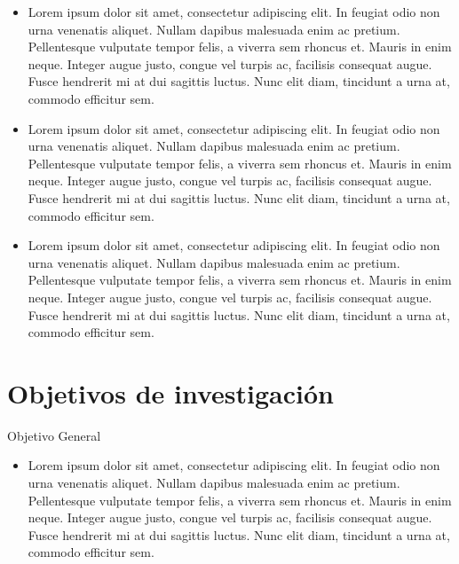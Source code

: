 \documentclass[letterpaper,twoside,10pt]{report}
\begin{document}
\begin{itemize}
 \item Lorem ipsum dolor sit amet, consectetur adipiscing elit. In feugiat odio non urna venenatis aliquet. Nullam dapibus malesuada enim ac pretium. Pellentesque vulputate tempor felis, a viverra sem rhoncus et. Mauris in enim neque. Integer augue justo, congue vel turpis ac, facilisis consequat augue. Fusce hendrerit mi at dui sagittis luctus. Nunc elit diam, tincidunt a urna at, commodo efficitur sem.
 \item Lorem ipsum dolor sit amet, consectetur adipiscing elit. In feugiat odio non urna venenatis aliquet. Nullam dapibus malesuada enim ac pretium. Pellentesque vulputate tempor felis, a viverra sem rhoncus et. Mauris in enim neque. Integer augue justo, congue vel turpis ac, facilisis consequat augue. Fusce hendrerit mi at dui sagittis luctus. Nunc elit diam, tincidunt a urna at, commodo efficitur sem.
 \item Lorem ipsum dolor sit amet, consectetur adipiscing elit. In feugiat odio non urna venenatis aliquet. Nullam dapibus malesuada enim ac pretium. Pellentesque vulputate tempor felis, a viverra sem rhoncus et. Mauris in enim neque. Integer augue justo, congue vel turpis ac, facilisis consequat augue. Fusce hendrerit mi at dui sagittis luctus. Nunc elit diam, tincidunt a urna at, commodo efficitur sem.
\end{itemize}


\section{Objetivos de investigación}

Objetivo General

\begin{itemize}
	\item Lorem ipsum dolor sit amet, consectetur adipiscing elit. In feugiat odio non urna venenatis aliquet. Nullam dapibus malesuada enim ac pretium. Pellentesque vulputate tempor felis, a viverra sem rhoncus et. Mauris in enim neque. Integer augue justo, congue vel turpis ac, facilisis consequat augue. Fusce hendrerit mi at dui sagittis luctus. Nunc elit diam, tincidunt a urna at, commodo efficitur sem.
\end{itemize}
\end{document}
